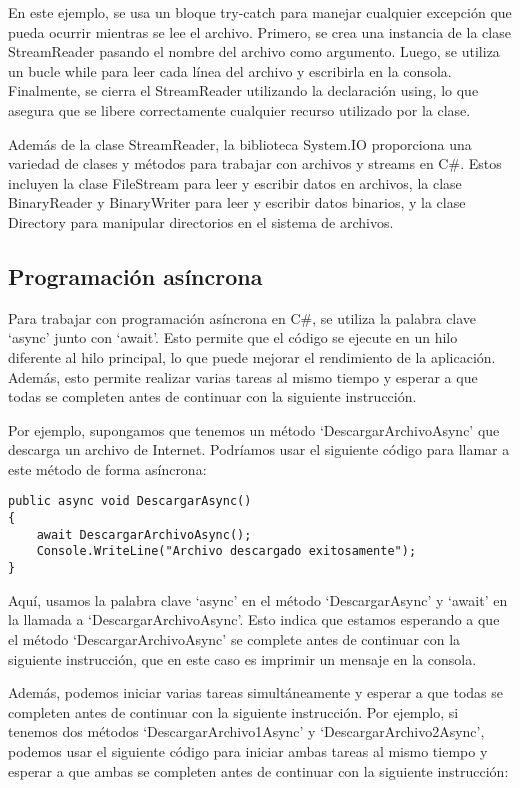 \documentclass[executivepaper]{article}
\begin{document}
En este ejemplo, se usa un bloque try-catch para manejar cualquier excepción que pueda ocurrir mientras se lee el archivo. Primero, se crea una instancia de la clase StreamReader pasando el nombre del archivo como argumento. Luego, se utiliza un bucle while para leer cada línea del archivo y escribirla en la consola. Finalmente, se cierra el StreamReader utilizando la declaración using, lo que asegura que se libere correctamente cualquier recurso utilizado por la clase.

Además de la clase StreamReader, la biblioteca System.IO proporciona una variedad de clases y métodos para trabajar con archivos y streams en C\#. Estos incluyen la clase FileStream para leer y escribir datos en archivos, la clase BinaryReader y BinaryWriter para leer y escribir datos binarios, y la clase Directory para manipular directorios en el sistema de archivos.

\subsection{Programación asíncrona}

Para trabajar con programación asíncrona en C\#, se utiliza la palabra clave \enquote*{async} junto con \enquote*{await}. Esto permite que el código se ejecute en un hilo diferente al hilo principal, lo que puede mejorar el rendimiento de la aplicación. Además, esto permite realizar varias tareas al mismo tiempo y esperar a que todas se completen antes de continuar con la siguiente instrucción.

Por ejemplo, supongamos que tenemos un método \enquote*{DescargarArchivoAsync} que descarga un archivo de Internet. Podríamos usar el siguiente código para llamar a este método de forma asíncrona:

\begin{lstlisting}
public async void DescargarAsync()
{
    await DescargarArchivoAsync();
    Console.WriteLine("Archivo descargado exitosamente");
}
\end{lstlisting}

Aquí, usamos la palabra clave \enquote*{async} en el método \enquote*{DescargarAsync} y \enquote*{await} en la llamada a \enquote*{DescargarArchivoAsync}. Esto indica que estamos esperando a que el método \enquote*{DescargarArchivoAsync} se complete antes de continuar con la siguiente instrucción, que en este caso es imprimir un mensaje en la consola.

Además, podemos iniciar varias tareas simultáneamente y esperar a que todas se completen antes de continuar con la siguiente instrucción. Por ejemplo, si tenemos dos métodos \enquote*{DescargarArchivo1Async} y \enquote*{DescargarArchivo2Async}, podemos usar el siguiente código para iniciar ambas tareas al mismo tiempo y esperar a que ambas se completen antes de continuar con la siguiente instrucción:
\end{document}
